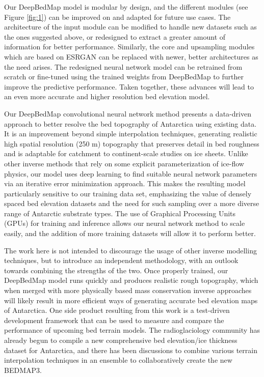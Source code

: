\documentclass[tc, manuscript]{copernicus}
\begin{document}
Our DeepBedMap model is modular by design, and the different modules (see Figure \ref{fig:1}) can be improved on and adapted for future use cases.
The architecture of the input module can be modified to handle new datasets such as the ones suggested above, or redesigned to extract a greater amount of information for better performance.
Similarly, the core and upsampling modules which are based on ESRGAN \citep{WangESRGANEnhancedSuperResolution2018} can be replaced with newer, better architectures as the need arises.
The redesigned neural network model can be retrained from scratch or fine-tuned using the trained weights from DeepBedMap to further improve the predictive performance.
Taken together, these advances will lead to an even more accurate and higher resolution bed elevation model.


\conclusions  %

Our DeepBedMap convolutional neural network method presents a data-driven approach to better resolve the bed topography of Antarctica using existing data.
It is an improvement beyond simple interpolation techniques, generating realistic high spatial resolution (250 m) topography that preserves detail in bed roughness and is adaptable for catchment to continent-scale studies on ice sheets.
Unlike other inverse methods that rely on some explicit parameterization of ice-flow physics, our model uses deep learning to find suitable neural network parameters via an iterative error minimization approach.
This makes the resulting model particularly sensitive to our training data set, emphasizing the value of densely spaced bed elevation datasets and the need for such sampling over a more diverse range of Antarctic substrate types.
The use of Graphical Processing Units (GPUs) for training and inference allows our neural network method to scale easily, and the addition of more training datasets will allow it to perform better.

The work here is not intended to discourage the usage of other inverse modelling techniques, but to introduce an independent methodology, with an outlook towards combining the strengths of the two.
Once properly trained, our DeepBedMap model runs quickly and produces realistic rough topography, which when merged with more physically based mass conservation inverse approaches \citep[e.g.][]{MorlighemDeepglacialtroughs2019} will likely result in more efficient ways of generating accurate bed elevation maps of Antarctica.
One side product resulting from this work is a test-driven development framework that can be used to measure and compare the performance of upcoming bed terrain models.
The radioglaciology community has already begun to compile a new comprehensive bed elevation/ice thickness dataset for Antarctica, and there has been discussions to combine various terrain interpolation techniques in an ensemble to collaboratively create the new BEDMAP3.
\end{document}
